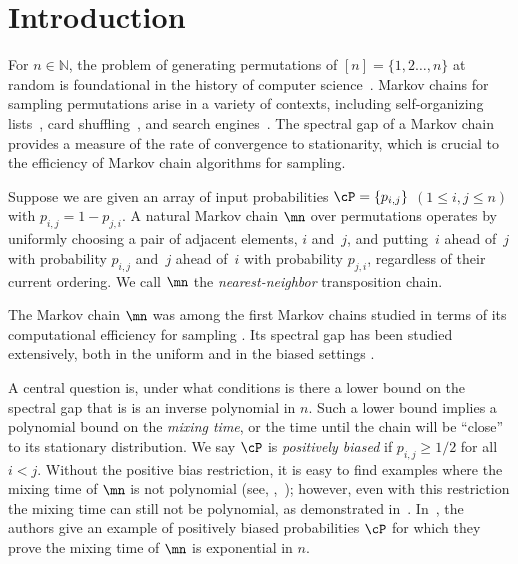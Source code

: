 \documentclass{toc}
\begin{document}
\begin{frontmatter}
%

\end{frontmatter}

%
%
%
\section{Introduction}\label{sec:intro}

For $n\in\mathbb{N}$, the problem of generating permutations of 
$[n]=\{1,2\dots,n\}$ at random is foundational in the history of 
computer science~\cite{knuth2}. Markov chains for sampling permutations 
arise in a variety of contexts, including self-organizing 
lists~\cite{selforganizingsurvey, rivest}, card shuffling~\cite{bd, 
wilson}, and search engines~\cite{search}. The spectral gap of a Markov 
chain provides a measure of the rate of convergence to stationarity, 
which is crucial to the efficiency of Markov chain algorithms for 
sampling.

Suppose we are given %
%
an array  %
of input probabilities $\cP = \{p_{i,j}\}$ 
%
%
%
$(1 \leq i, j \leq n)$   %
with $p_{i, j} = 1-p_{j, i}$.  A natural 
Markov chain $\mn$ over permutations operates by uniformly choosing a 
pair of adjacent elements, $i$ and~$j$, and putting~$i$ ahead of~$j$ 
with probability $p_{i,j}$ and~$j$ ahead of~$i$ with probability 
$p_{j,i}$, %
%
regardless   %
of their current ordering.  We call $\mn$ the 
\emph{nearest-neighbor} transposition chain.

The Markov chain $\mn$ was among the first Markov chains studied in 
terms of its computational efficiency for sampling \cite{ald, diasha, 
dsc}. Its spectral gap has been studied extensively, both in 
the uniform and
in the  %
biased settings \cite{BBHM05,bmrs,DSC93b, diasha, wilson}. 

%
%
A central question is, %
under what conditions %
is there a lower bound on the spectral gap that is
is an inverse polynomial in $n$.
%
Such a lower bound    %
implies a polynomial
%
bound 
on the \emph{mixing time}, or the time until the chain will be 
``close'' to its stationary distribution. We say $\cP$ is 
\emph{positively biased} if $p_{i,j}\geq 1/2$ for all $i<j$.
Without the %
%
positive bias  %
restriction, it is easy to find examples where the mixing time of $\mn$ is
not polynomial (see, \eg,~\cite{bmrs}); 
however, even with this restriction the mixing time can still not be polynomial, as demonstrated in~\cite{bmrs}.  In~\cite{bmrs}, the authors give an example of positively biased probabilities $\cP$ for which they prove the mixing time of $\mn$ is exponential in $n.$
\end{document}
